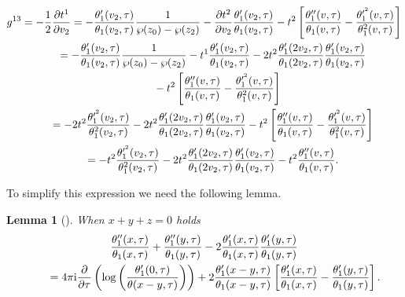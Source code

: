 \documentclass[pdftex]{sigma}%
\numberwithin{equation}{section}
\newtheorem{Lemma}[Theorem]{Lemma}
\begin{document}
\begin{gather}
g^{13}=-\frac{1}{2}\frac{\partial t^{1}}{\partial v_2}=-\frac{\theta_1^{\prime}(v_2,\tau)} {\theta_1(v_2,\tau)}\frac{1}{\wp(z_0) -\wp(z_2)}-\frac{\partial t^2}{\partial v_2} \frac{\theta_1^{\prime}(v_2,\tau)}{\theta_1(v_2,\tau)} -t^2\left[\frac{\theta_1^{\prime\prime}(v,\tau)}{\theta_1(v,\tau)} -\frac{\theta_1^{\prime^2}(v,\tau)}{\theta_1^2(v,\tau)}\right]\nonumber
\\ \hphantom{g^{13}}
{}=-\frac{\theta_1^{\prime}(v_2,\tau)}{\theta_1(v_2,\tau)}\frac{1}{\wp(z_0)-\wp(z_2)} -t^1\frac{\theta_1^{\prime}(v_2,\tau)}{\theta_1(v_2,\tau)} -2t^2\frac{\theta_1^{\prime}(2v_2,\tau)}{\theta_1(2v_2,\tau)} \frac{\theta_1^{\prime}(v_2,\tau)}{\theta_1(v_2,\tau)}\nonumber
\\ \hphantom{g^{13}=}
-t^2\left[\frac{\theta_1^{\prime\prime}(v,\tau)}{\theta_1(v,\tau)} -\frac{\theta_1^{\prime^2}(v,\tau)}{\theta_1^2(v,\tau)}\right]\nonumber
\\ \hphantom{g^{13}}
=-2t^2\frac{\theta_1^{\prime^2}(v_2,\tau)}{\theta_1^2(v_2,\tau)}-2t^2\frac{\theta_1^
{\prime}(2v_2,\tau)}{\theta_1(2v_2,\tau)}\frac{\theta_1^{\prime}(v_2,\tau)}{\theta_1(v_2,\tau)} -t^2\left[\frac{\theta_1^{\prime\prime}(v,\tau)}{\theta_1(v,\tau)} -\frac{\theta_1^{\prime^2}(v,\tau)}{\theta_1^2(v,\tau)}\right]\nonumber
\\ \hphantom{g^{13}}
=-t^2\frac{\theta_1^{\prime^2}(v_2,\tau)}{\theta_1^2(v_2,\tau)}
-2t^2\frac{\theta_1^{\prime}(2v_2,\tau)}{\theta_1(2v_2,\tau)}
\frac{\theta_1^{\prime}(v_2,\tau)}{\theta_1(v_2,\tau)}
-t^2\frac{\theta_1^{\prime\prime}(v,\tau)}{\theta_1(v,\tau)}.\label{g131}
\end{gather}

To simplify this expression we need the following lemma.

\begin{Lemma}[\cite{BertolaM.1}]\label{lemmaa1l}
When $x+y+z=0$ holds
\begin{gather}
\frac{\theta_1^{\prime\prime}(x,\tau)}{\theta_1(x,\tau)}
+\frac{\theta_1^{\prime\prime}(y,\tau)}{\theta_1(y,\tau)}
-2\frac{\theta_1^{\prime}(x,\tau)}{\theta_1(x,\tau)}
\frac{\theta_1^{\prime}(y,\tau)}{\theta_1(y,\tau)}\nonumber
\\ \qquad
=4\pi {\rm i} \frac{\partial}{\partial \tau}\left(\log\left(\frac{\theta_1^{\prime}(0,\tau)}{\theta(x-y,\tau)}\right)\right) +2\frac{\theta_1^{\prime}(x-y,\tau)}{\theta_1(x-y,\tau)} \left[\frac{\theta_1^{\prime}(x,\tau)}{\theta_1(x,\tau)} -\frac{\theta_1^{\prime}(y,\tau)}{\theta_1(y,\tau)}\right].
\label{lemmaa1}
\end{gather}
\end{Lemma}
\end{document}
